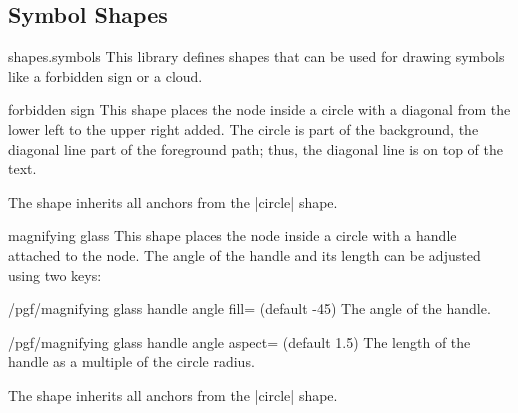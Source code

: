 \subsection{Symbol Shapes}

\begin{pgflibrary}{shapes.symbols}
  This library defines shapes that can be used for drawing symbols
  like a forbidden sign or a cloud.
\end{pgflibrary}



\begin{shape}{forbidden sign}
  This shape places the node inside a circle with a diagonal from the
  lower left to the upper right added. The circle is part of the
  background, the diagonal line part of the foreground path; thus, the
  diagonal line is on top of the text.
  
\begin{codeexample}[]
\end{codeexample}

  The shape inherits all anchors from the |circle| shape.
\end{shape}


\begin{shape}{magnifying glass}
  This shape places the node inside a circle with a handle attached to
  the node. The angle of the handle and its length can be adjusted
  using two keys:

  \begin{key}{/pgf/magnifying glass handle angle fill= (default -45)}
    The angle of the handle. 
  \end{key}

  \begin{key}{/pgf/magnifying glass handle angle aspect= (default 1.5)}
    The length of the handle as a multiple of the circle radius.
  \end{key}
  
\begin{codeexample}[]
\end{codeexample}
  The shape inherits all anchors from the |circle| shape.
\end{shape}


